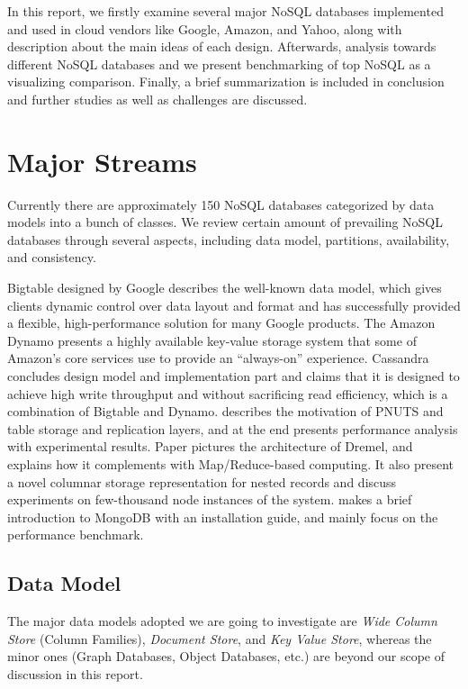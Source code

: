 \documentclass[letter,twocolumn]{article}
\begin{document}
In this report, we firstly examine several major NoSQL databases implemented and used in cloud vendors like Google, Amazon, and Yahoo, along with description about the main ideas of each design. Afterwards, analysis towards different NoSQL databases and we present benchmarking of top NoSQL as a visualizing comparison. Finally, a brief summarization is included in conclusion and further studies as well as challenges are discussed.

\section{Major Streams} \label{majorstream}
Currently there are approximately 150 NoSQL databases categorized by data models into a bunch of classes.\citep{Unknown2012} We review certain amount of prevailing NoSQL databases through several aspects, including data model, partitions, availability, and consistency. 

Bigtable\citep{Chang2006} designed by Google describes the well-known data model, which gives clients dynamic control over data layout and format and has successfully provided a flexible, high-performance solution for many Google products. 
The Amazon Dynamo\citep{DeCandia2007} presents a highly available key-value storage system that some of Amazon's core services use to provide an ``always-on'' experience.
Cassandra\citep{LakshamAvinash2010} concludes design model and implementation part and claims that it is designed to achieve high write throughput and without sacrificing read efficiency, which is a combination of Bigtable and Dynamo. 
\citep{Silberstein2008} describes the motivation of PNUTS and table storage and replication layers, and at the end presents performance analysis with experimental results.  
Paper \citep{Melnik2010} pictures the architecture of Dremel, and explains how it complements with Map/Reduce-based computing. It also present a novel columnar storage representation for nested records and discuss experiments on few-thousand node instances of the system.
\citep{Suter2012} makes a brief introduction to MongoDB with an installation guide, and mainly focus on the performance benchmark.

\subsection{Data Model} \label{datamodel}
The major data models adopted we are going to investigate are \textit{Wide Column Store} (Column Families), \textit{Document Store}, and \textit{Key Value Store}, whereas the minor ones (Graph Databases, Object Databases, etc.) are beyond our scope of discussion in this report. 
\end{document}
